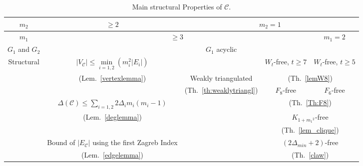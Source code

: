 \documentclass[final]{dmtcs-episciences}
\begin{document}
\begin{center}
\begin{table}[ht]
\centering
\footnotesize
\begin{tabular}{|c|c|c|c|c|}

\hline 
$m_2$ &\multicolumn{1}{|c|}{$\geq 2$}& \multicolumn{3}{|c|}{$m_2=1$}\\
\hline
$m_1$ &\multicolumn{3}{|c|}{$\geq 3$}& $m_1=2$\\
\hline
$G_1$ and $G_2$& &$G_1$ acyclic&&\\
\hline
\hline
\multirow{4}{*}{Structural }&\multicolumn{1}{|c|}{$|V_{\mathcal{C}}|\leq \min\limits_{i=1,2}(m_i^2|E_i|)$}&&$W_t$-free, $t\geq 7$&$W_t$-free, $t\geq 5$\\
\multirow{4}{*}{property}&\multicolumn{1}{|c|}{(Lem.~\ref{vertexlemma})}&Weakly triangulated&\multicolumn{2}{|c|}{(Th.~\ref{lemW8})}\\
\cline{4-5}
&\multicolumn{1}{|c|}{}&(Th.~\ref{th:weaklytriangl})&$F_8$-free&$F_6$-free\\
\multirow{3}{*}{of $\mathcal{C}$}&\multicolumn{1}{|c|}{$\Delta(\mathcal{C})\leq \sum\limits_{i=1,2}2\Delta_im_i(m_i-1)$}&&\multicolumn{2}{|c|}{(Th.~\ref{Th:F8})}\\
\cline{4-5}
&\multicolumn{1}{|c|}{(Lem.~\ref{deglemma})}& &\multicolumn{2}{|c|}{$K_{1+{m_1}^2}$-free}\\
&\multicolumn{1}{|c|}{} &&\multicolumn{2}{|c|}{(Th.~\ref{lem_clique})}\\
\cline{4-5}
&\multicolumn{1}{|c|}{Bound of $|E_{\mathcal{C}}|$ using the first Zagreb Index}&&\multicolumn{2}{|c|}{$(2\Delta_{min}+2)$-free}\\
&\multicolumn{1}{|c|}{(Lem.~\ref{edgelemma})}&&\multicolumn{2}{|c|}{(Th.~\ref{claw})}\\
\hline
\end{tabular}
\caption{Main structural Properties of $\mathcal{C}$.}
\label{table-structure}
\end{table}
\end{center}
\end{document}
